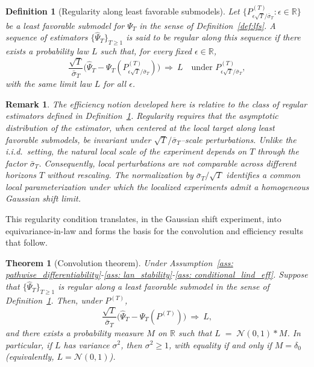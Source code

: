 \documentclass[11pt]{article}
\newtheorem{thm}{Theorem}
\newtheorem{rem}{Remark}
\newtheorem{defn}{Definition}
\begin{document}
\begin{defn}[Regularity along least favorable submodels]\label{def:regularity}
Let $\{P^{(T)}_{\epsilon\sqrt T/\bar \sigma_T}:\epsilon\in\mathbb R\}$ be a
least favorable submodel for $\Psi_T$ in the sense of
Definition~\ref{def:lfs}. A sequence of estimators
$\{\widehat\Psi_T\}_{T\ge1}$ is said to be \emph{regular} along this sequence
if there exists a probability law $L$ such that, for every fixed
$\epsilon\in\mathbb R$,
\begin{equation}
\frac{\sqrt{T}}{\bar\sigma_T}
\Big(\widehat\Psi_T-\Psi_T(P^{(T)}_{\epsilon\sqrt T/\bar \sigma_T})\Big)
\ \Rightarrow\ L
\quad\text{under } P^{(T)}_{\epsilon\sqrt T/\bar \sigma_T},
\end{equation}
with the same limit law $L$ for all $\epsilon$.
\end{defn}

\begin{rem}
    The efficiency notion developed here is relative to the class of regular
estimators defined in Definition~\ref{def:regularity}. Regularity requires
that the asymptotic distribution of the estimator, when centered at the
local target along least favorable submodels, be invariant under
$\sqrt{T}/\bar \sigma_T$–scale perturbations.
Unlike the i.i.d.\ setting, the natural local scale of the experiment
depends on $T$ through the factor $\bar \sigma_T$.
Consequently, local perturbations are not comparable across different
horizons $T$ without rescaling. The normalization by $\bar \sigma_T/ \sqrt{T}$
identifies a common local parameterization under which the localized
experiments admit a homogeneous Gaussian shift limit.
 \end{rem}

This regularity condition translates, in the Gaussian shift experiment, into
equivariance-in-law and forms the basis for the convolution and
efficiency results that follow.

\begin{thm}[Convolution theorem]
\label{thm: conv_thm}
Under Assumption~\ref{ass: pathwise_differentiability}-\ref{ass: lan_stability}-\ref{ass: conditional_lind_eff}. 
Suppose that $\{\widehat{\Psi}_T\}_{T\geq 1}$ is regular along a least
favorable submodel in the sense of
Definition~\ref{def:regularity}. Then, under $P^{(T)}$,
\begin{equation}
\frac{\sqrt{T}}{\bar\sigma_T}\big(\widehat\Psi_T-\Psi_T(P^{(T)})\big)
\ \Rightarrow\ L,
\end{equation}
and there exists a probability measure $M$ on $\mathbb R$ such that $L \;=\; \mathcal N(0,1)\ast M$. 
In particular, if $L$ has variance $\sigma^2$, then $\sigma^2\ge 1$, with
equality if and only if $M=\delta_0$ (equivalently,
$L=\mathcal N(0,1)$).
\end{thm}
\end{document}

